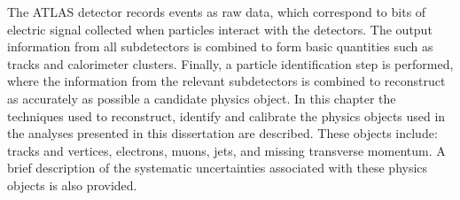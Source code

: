 
The ATLAS detector records events as raw data, which correspond to bits of electric signal collected when particles interact with the detectors. The output information from all subdetectors is combined to form basic quantities such as tracks and calorimeter clusters. Finally, a particle identification step is performed, where the information from the relevant subdetectors is combined to reconstruct as accurately as possible a candidate physics object. In this chapter the techniques used to reconstruct, identify and calibrate the physics objects used in the analyses presented in this dissertation are described. These objects include: tracks and vertices, electrons, muons, jets, and missing transverse momentum. A brief description of the systematic uncertainties associated with these physics objects is also provided.
